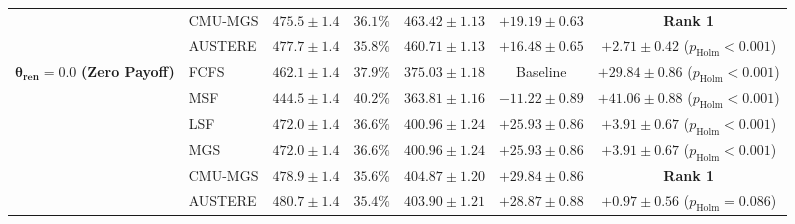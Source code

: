 \documentclass[final,5p,times,twocolumn]{elsarticle}
\begin{document}
\begin{table}[t]
{\begin{tabular}{clccccc}
 & CMU-MGS & $475.5 \pm 1.4$ & $36.1\%$ & $\mathbf{463.42 \pm 1.13}$ & $\mathbf{+19.19 \pm 0.63}$ & \textbf{Rank 1} \\
 & AUSTERE & $477.7 \pm 1.4$ & $35.8\%$ & $460.71 \pm 1.13$ & $+16.48 \pm 0.65$ & $+2.71 \pm 0.42$ ($p_{\text{Holm}} < 0.001$) \\
\midrule
\multirow{6}{*}{$\boldsymbol{\theta_{\text{ren}} = 0.0}$ \textbf{(Zero Payoff)}}
 & FCFS    & $462.1 \pm 1.4$ & $37.9\%$ & $375.03 \pm 1.18$ & Baseline & $+29.84 \pm 0.86$ ($p_{\text{Holm}} < 0.001$) \\
 & MSF     & $444.5 \pm 1.4$ & $40.2\%$ & $363.81 \pm 1.16$ & $-11.22 \pm 0.89$ & $+41.06 \pm 0.88$ ($p_{\text{Holm}} < 0.001$) \\
 & LSF     & $472.0 \pm 1.4$ & $36.6\%$ & $400.96 \pm 1.24$ & $+25.93 \pm 0.86$ & $+3.91 \pm 0.67$ ($p_{\text{Holm}} < 0.001$) \\
 & MGS     & $472.0 \pm 1.4$ & $36.6\%$ & $400.96 \pm 1.24$ & $+25.93 \pm 0.86$ & $+3.91 \pm 0.67$ ($p_{\text{Holm}} < 0.001$) \\
 & CMU-MGS & $478.9 \pm 1.4$ & $35.6\%$ & $\mathbf{404.87 \pm 1.20}$ & $\mathbf{+29.84 \pm 0.86}$ & \textbf{Rank 1} \\
 & AUSTERE & $480.7 \pm 1.4$ & $35.4\%$ & $403.90 \pm 1.21$ & $+28.87 \pm 0.88$ & $+0.97 \pm 0.56$ ($p_{\text{Holm}} = 0.086$) \\
\bottomrule
\end{tabular}
}
\end{table}
\end{document}
